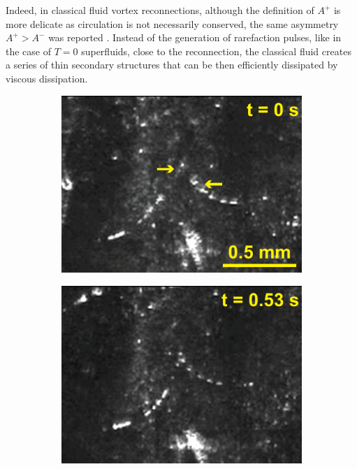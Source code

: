 \documentclass[9pt,twocolumn,twoside]{pnas-new}
\begin{document}
Indeed, in classical fluid vortex reconnections, although the definition of $A^+$ is more delicate as circulation is not necessarily conserved, the same asymmetry $A^+>A^-$ was reported \cite{yaoSeparationScalingViscous2020}. Instead of the generation of rarefaction pulses, like in the case of $T=0$ superfluids, close to the reconnection, the classical fluid creates a series of thin secondary structures that can be then efficiently dissipated by viscous dissipation.

\begin{figure}
       \centering
	\begin{subfigure}[b]{0.24\textwidth}
		\centering
		\includegraphics*[width=\textwidth]{exp-snap-1.pdf}
	\end{subfigure}
	\begin{subfigure}[b]{0.24\textwidth}
		\centering
		\includegraphics*[width=\textwidth]{exp-snap-2.pdf}

\end{subfigure}
\end{figure}
\end{document}
